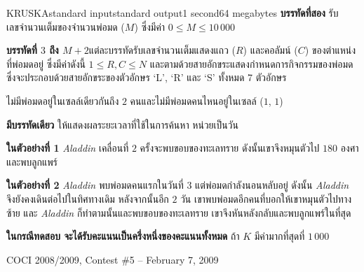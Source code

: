 \documentclass[11pt,a4paper]{article}
\begin{document}
\begin{problem}{KRUSKA}{standard input}{standard output}{1 second}{64 megabytes}
\textbf{บรรทัดที่สอง} รับเลขจำนวนเต็มของจำนวนพ่อมด ($M$) ซึ่งมีค่า $0 \leq M \leq 10\,000$

\textbf{บรรทัดที่ $3$ ถึง $M+2$}แต่ละบรรทัดรับเลขจำนวนเต็มแสดงแถว ($R$) และคอลัมน์ ($C$) ของตำแหน่งที่พ่อมดอยู่ ซึ่งมีค่าดังนี้ $1 \leq R, C \leq N$ และตามด้วยสายอักขระแสดงกำหนดการกิจกรรมของพ่อมดซึ่งจะประกอบด้วยสายอักขระของตัวอักษร ‘L’, ‘R’ และ ‘S’ ทั้งหมด 7 ตัวอักษร

ไม่มีพ่อมดอยู่ในเซลล์เดียวกันถึง $2$ คนและไม่มีพ่อมดคนไหนอยู่ในเซลล์ ($1$, $1$)




\OutputFile

\textbf{มีบรรทัดเดียว} ให้แสดงผลระยะเวลาที่ใช้ในการค้นหา หน่วยเป็นวัน

\Examples

\begin{example}
%
%
%
\end{example}

\Note 

\textbf{ในตัวอย่างที่ 1} \textit{Aladdin} เคลื่อนที่ $2$ ครั้งจะพบขอบของทะเลทราย ดังนั้นเขาจึงหมุนตัวไป $180$ องศาและพบลูกแพร์

\textbf{ในตัวอย่างที่ 2} \textit{Aladdin} พบพ่อมดคนแรกในวันที่ $3$ แต่พ่อมดกำลังนอนหลับอยู่ ดังนั้น \textit{Aladdin} จึงยังคงเดินต่อไปในทิศทางเดิม หลังจากนั้นอีก $2$ วัน เขาพบพ่อมดอีกคนที่บอกให้เขาหมุนตัวไปทางซ้าย และ \textit{Aladdin} ก็ทำตามนั้นและพบขอบของทะเลทราย เขาจึงหันหลังกลับและพบลูกแพร์ในที่สุด

\Scoring

\textbf{ในกรณีทดสอบ จะได้รับคะแนนเป็นครึ่งหนึ่งของคะแนนทั้งหมด} ถ้า $K$ มีค่ามากที่สุดที่ $1\,000$
  
\Source

COCI 2008/2009, Contest \#5 – February 7, 2009

\end{problem}
\end{document}
